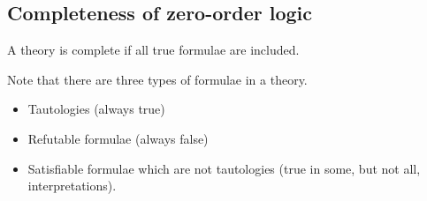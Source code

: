 
\subsection{Completeness of zero-order logic}

A theory is complete if all true formulae are included.

Note that there are three types of formulae in a theory.

\begin{itemize}
\item Tautologies (always true)
\item Refutable formulae (always false)
\item Satisfiable formulae which are not tautologies (true in some, but not all, interpretations).
\end{itemize}

